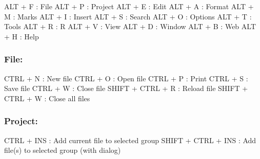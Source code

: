 \vspace{-0.5cm}
\begin{Rtables}[caption={[Main menu keyboard shortcuts]
    Main Menu keyboard shortcuts},
  label=menu:main]
  ALT + F                 : File
  ALT + P                 : Project
  ALT + E                 : Edit
  ALT + A                 : Format
  ALT + M                 : Marks
  ALT + I                 : Insert
  ALT + S                 : Search
  ALT + O                 : Options
  ALT + T                 : Tools
  ALT + R                 : R
  ALT + V                 : View
  ALT + D                 : Window
  ALT + B                 : Web
  ALT + H                 : Help
\end{Rtables}


\subsubsection{File:}

\vspace{-0.5cm}
\begin{Rtables}[caption={[File menu keyboard shortcuts]
    File menu keyboard shortcuts},
  label=menu:file]
  CTRL  + N               : New file
  CTRL  + O               : Open file
  CTRL  + P               : Print
  CTRL  + S               : Save file
  CTRL  + W               : Close file
  SHIFT + CTRL + R        : Reload file
  SHIFT + CTRL + W        : Close all files
\end{Rtables}


\subsubsection{Project:}

\vspace{-0.5cm}
\begin{Rtables}[caption={[Project menu keyboard shortcuts]
    Project keyboard shortcuts},
  label=menu:project]
  CTRL  + INS             : Add current file to selected group
  SHIFT + CTRL + INS      : Add file(s) to selected group (with dialog)
\end{Rtables}


